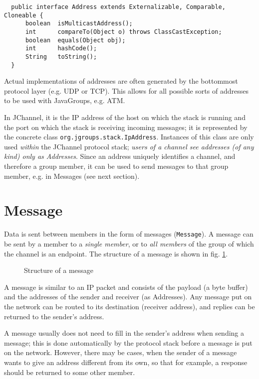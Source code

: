   \begin{small}
  \begin{verbatim}
  public interface Address extends Externalizable, Comparable, Cloneable {
      boolean  isMulticastAddress();
      int      compareTo(Object o) throws ClassCastException;
      boolean  equals(Object obj);
      int      hashCode();
      String   toString();
  }
  \end{verbatim}
  \end{small}
    
  Actual implementations of addresses are often generated by the bottommost protocol
  layer (e.g. UDP or TCP). This allows for all possible sorts of addresses to be used
  with JavaGroups, e.g. ATM.

  In JChannel, it is the IP address of the host on which the stack is running and
  the port on which the stack is receiving incoming messages; it is represented by
  the concrete class {\tt org.jgroups.stack.IpAddress}. Instances of this class
  are only used {\em within} the JChannel protocol stack; {\em users of a channel see
  addresses (of any kind) only as Addresses}. Since an address uniquely
  identifies a channel, and therefore a group member, it can be used to send
  messages to that group member, e.g. in Messages (see next section).




  \section{Message} \label{Messages}

  Data is sent between members in the form of messages ({\tt Message}). A message can
  be sent by a member to a {\em single member}, or to {\em all members} of the group
  of which the channel is an endpoint. The structure of a message is shown in
  fig. \ref{MessageFig}.

  \begin{figure}[htb]
       \caption{Structure of a message}
       \label{MessageFig}
  \end{figure}

  A message is similar to an IP packet and consists of the payload (a byte buffer)
  and the addresses of the sender and receiver (as Addresses). Any message put on the
  network can be routed to its destination (receiver address), and replies can be
  returned to the sender's address.

  A message usually does not need to fill in the sender's address when sending a
  message; this is done automatically by the protocol stack before a message is
  put on the network. However, there may be cases, when the sender of a message
  wants to give an address different from its own, so that for example, a response
  should be returned to some other member.

